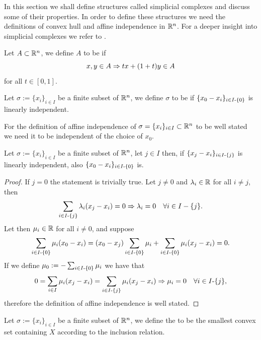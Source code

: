 \documentclass[../1.tex]{subfiles}
\begin{document}
    In this section we shall define structures called simplicial complexes and discuss some of their properties. In order to define these structures
    we need the definitions of convex hull and affine independence in $\mathbb{R}^n$. For a deeper insight into simplicial complexes we refer to \cite{singerthorpe,rotman}.    

    \begin{defn}
        Let $A \subset \mathbb{R}^n$, we define $A$ to be  if
        \[ x,y \in A \Rightarrow tx + (1+t)y \in A \]
        for all $t \in [0,1]$.
    \end{defn}

    \begin{defn}
        Let $\sigma := \{x_i\}_{i \in I}$ be a finite subset of $\mathbb{R}^n$, we define $\sigma$ to be  if 
        $\{ x_0 - x_i\}_{i \in I \text{-} \{0\}}$ is linearly independent.
    \end{defn}

    For the definition of affine independence of $\sigma = \{x_i\}_{i \in I} \subset \mathbb{R}^n$ to be well stated we need it to be independent of the choice of $x_0$.
      
    \begin{prop}
        Let $\sigma := \{x_i\}_{i \in I}$ be a finite subset of $\mathbb{R}^n$, let $j \in I$ then, if $\{ x_j - x_i\}_{i \in I \text{-} \{j\}}$ is linearly independent,
        also $\{ x_0 - x_i\}_{i \in I \text{-} \{0\}}$ is. 
    \end{prop}
    \begin{proof}
        If $j=0$ the statement is trivially true. Let $j \neq 0$ and $\lambda_i \in \mathbb{R}$ for all $i \neq j$, then
        \[ \sum_{i \in I \text{-} \{j\}} \lambda_i (x_j - x_i) = 0 \Rightarrow \lambda_i = 0 \quad \forall i \in I-\{j\}.\]
        Let then $\mu_i \in \mathbb{R}$ for all $i \neq 0$, and suppose 
        \[ \sum_{i \in I \text{-} \{0\}} \mu_i (x_0 - x_i) = (x_0 - x_j) \sum_{i \in I \text{-} \{0\}} \mu_i + \sum_{i \in I \text{-} \{0\}} \mu_i (x_j - x_i) = 0.\]
        If we define $\mu_0 := -\sum_{i \in I \text{-} \{0\}} \mu_i$ we have that
        \[ 0 = \sum_{i \in I} \mu_i (x_j - x_i) = \sum_{i \in I \text{-} \{j\}} \mu_i (x_j - x_i) \Rightarrow \mu_i = 0 \quad \forall i \in I \text{-} \{j\},\]
        therefore the definition of affine independence is well stated.
    \end{proof}

    \begin{defn}
        Let $\sigma := \{x_i\}_{i \in I}$ be a finite subset of $\mathbb{R}^n$, we define the  to be 
        the smallest convex set containing $X$ according to the inclusion relation.
    \end{defn}
\end{document}

